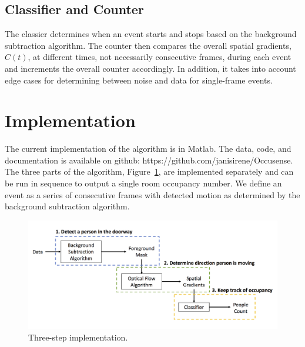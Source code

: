 \documentclass[12pt,oneside]{article} %
\begin{document}
\subsection{Classifier and Counter}
The classier determines when an event starts and stops based on the background subtraction algorithm. The counter then compares the overall spatial gradients, $C(t)$, at different times, not necessarily consecutive frames, during each event and increments the overall counter accordingly. In addition, it takes into account edge cases for determining between noise and data for single-frame events.

\newpage

\section{Implementation}  %
The current implementation of the algorithm is in Matlab. The data, code, and documentation is available
on github: https://github.com/janisirene/Occusense.
 The three parts of the algorithm, Figure~\ref{threestep},
are implemented
separately and can be run in sequence to output a single room occupancy number. We define an event as a series of consecutive frames with detected motion as determined by the background subtraction algorithm.
\begin{figure}[htb] %
\centering
\includegraphics[scale=0.2]{images/threestep.png}
\caption{Three-step implementation.}
\label{threestep}
\end{figure}
\end{document}
